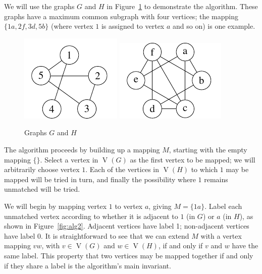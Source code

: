\documentclass[letterpaper]{article}
\DeclareMathOperator{\V}{V}
\begin{document}
We will use the graphs $G$ and $H$ in Figure~\ref{fig:alg1} to demonstrate the
algorithm.  These graphs have a maximum common subgraph with four vertices; the
mapping $\{1a, 2f, 3d, 5b\}$ (where vertex $1$ is assigned to vertex $a$ and so
on) is one example.

\begin{figure}[ht]
\centering
    \includegraphics{graph_G}
    \includegraphics{graph_H}
\caption{Graphs $G$ and $H$}
\label{fig:alg1}
\end{figure}

The algorithm proceeds by building up a mapping $M$, starting with the empty
mapping $\{\}$. Select a vertex in $\V(G)$ as the first vertex to
be mapped; we will arbitrarily choose vertex $1$. Each of the vertices in $\V(H)$
to which $1$ may be mapped will be tried in turn, and finally the possibility where
$1$ remains unmatched will be tried.

We will begin by mapping vertex $1$ to vertex $a$, giving $M=\{1a\}$.  Label
each unmatched vertex according to whether it is adjacent to $1$ (in $G$) or
$a$ (in $H$), as shown in Figure~\ref{fig:alg2}.  Adjacent vertices have label
1; non-adjacent vertices have label 0.  It is straightforward to see that we
can extend $M$ with a vertex mapping $vw$, with $v \in \V(G)$ and $w \in
\V(H)$, if and only if $v$ and $w$ have the same label.  This property that
two vertices may be mapped together if and only if they share a label is the
algorithm's main invariant.
\end{document}
